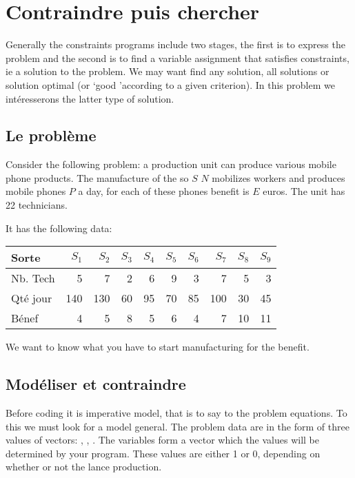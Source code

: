 \chapter{Contraindre puis chercher}

\noindent Generally the constraints programs include
two stages, the first is to express the problem and the second
is to find a variable assignment that satisfies
constraints, ie a solution to the problem. We may want
find any solution, all solutions or solution
optimal (or `good 'according to a given criterion). In this problem we
intéresserons the latter type of solution.

\section{Le problème}
\label{sec:immoral}

Consider the following problem: a production unit can produce
various mobile phone products. The manufacture of the so $ S $
$ N $ mobilizes workers and produces mobile phones $ P $ a day,
for each of these phones benefit is $ E $ euros. The unit has
22 technicians.

It has the following data:

\begin{center}
    \begin{tabular}{|l|r|r|r|r|r|r|r|r|r|}
        \hline
        Sorte & $S_1$ & $S_2$ & $S_3$ & $S_4$ &
                $S_5$ & $S_6$ & $S_7$ & $S_8$ & $S_9$\\ \hline
        Nb. Tech &5&7&2&6&9&3&7&5&3\\ \hline
        Qté jour&140&130&60&95&70&85&100&30&45\\ \hline
        Bénef&4&5&8&5&6&4&7&10&11\\ \hline
    \end{tabular}
\end{center}



We want to know what you have to start manufacturing for the benefit.

\newpage
\section{Modéliser et contraindre}

Before coding it is imperative model, that is to say to
the problem equations. To this we must look for a model
general. The problem data are in the form of three
values of vectors: , ,
. The variables form a vector  which
the values will be determined by your program. These values are
either 1 or 0, depending on whether or not the lance production.

